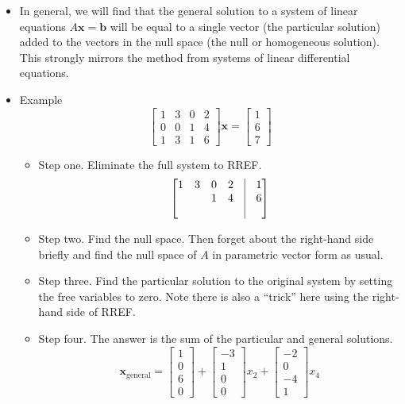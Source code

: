 \documentclass[11pt,oneside]{amsbook}
\theoremstyle{definition}
\theoremstyle{plain}
\theoremstyle{definition}
\theoremstyle{remark}
\numberwithin{equation}{section}
\numberwithin{figure}{section}
\begin{document}
\begin{itemize}
  The general solution is
  \[\mathbf{x}_{\mathrm{general}}
    =\begin{bmatrix}3/2\\0\end{bmatrix}
    +\begin{bmatrix}-3/2\\1\end{bmatrix}y
  \]
  which is the line translated away from the origin found above.
\item In general, we will find that the general solution to a system of linear equations $A\mathbf{x}=\mathbf{b}$ will be equal to a single vector (the particular solution) added to the vectors in the null space (the null or homogeneous solution). This strongly mirrors the method from systems of linear differential equations.
\item Example
  \[\begin{bmatrix}
      1&3&0&2\\0&0&1&4\\1&3&1&6
    \end{bmatrix}
    \mathbf{x}=
    \begin{bmatrix}
      1\\6\\7
    \end{bmatrix}
  \]
  \begin{itemize}
  \item Step one. Eliminate the full system to RREF.
    \[\begin{bmatrix}
        1&3&0&2&\vline&1\\
        &&1&4&\vline&6\\
        &&&&\vline&
      \end{bmatrix}
    \]
  \item Step two. Find the null space. Then forget about the right-hand side briefly and find the null space of $A$ in parametric vector form as usual.
  \item Step three. Find the particular solution to the original system by setting the free variables to zero. Note there is also a ``trick'' here using the right-hand side of RREF.
  \item Step four. The answer is the sum of the particular and general solutions.
    \[\mathbf{x}_{\mathrm{general}}
      =\begin{bmatrix}1\\0\\6\\0\end{bmatrix}
      +\begin{bmatrix}-3\\1\\0\\0\end{bmatrix}x_2
      +\begin{bmatrix}-2\\0\\-4\\1\end{bmatrix}x_4
    \]
  \end{itemize}
\end{itemize}
\end{document}
